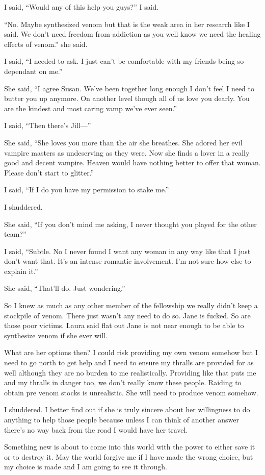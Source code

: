 I said, ``Would any of this help you guys?'' I said.

``No. Maybe synthesized venom but that is the weak area in her research like I said. We don't need freedom from addiction as you well know we need the healing effects of venom.'' she said.

I said, ``I needed to ask. I just can't be comfortable with my friends being so dependant on me.''

She said, ``I agree Susan. We've been together long enough I don't feel I need to butter you up anymore. On another level though all of us love you dearly. You are the kindest and most caring vamp we've ever seen.''

I said, ``Then there's Jill---''

She said, ``She loves you more than the air she breathes. She adored her evil vampire masters as undeserving as they were. Now she finds a lover in a really good and decent vampire. Heaven would have nothing better to offer that woman. Please don't start to glitter.''

I said, ``If I do you have my permission to stake me.''

I shuddered.

She said, ``If you don't mind me asking, I never thought you played for the other team?''

I said, ``Subtle. No I never found I want any woman in any way like that I just don't want that. It's an intense romantic involvement. I'm not sure how else to explain it.''

She said, ``That'll do. Just wondering.''

So I knew as much as any other member of the fellowship we really didn't keep a stockpile of venom. There just wasn't any need to do so. Jane is fucked. So are those poor victims. Laura said flat out Jane is not near enough to be able to synthesize venom if she ever will.

What are her options then? I could risk providing my own venom somehow but I need to go north to get help and I need to ensure my thralls are provided for as well although they are no burden to me realistically. Providing like that puts me and my thralls in danger too, we don't really know these people. Raiding to obtain pre \chichenitza* venom stocks is unrealistic. She will need to produce venom somehow.

I shuddered. I better find out if she is truly sincere about her willingness to do anything to help those people because unless I can think of another answer there's no way back from the road I would have her travel.

Something new is about to come into this world with the power to either save it or to destroy it. May the world forgive me if I have made the wrong choice, but my choice is made and I am going to see it through.


























